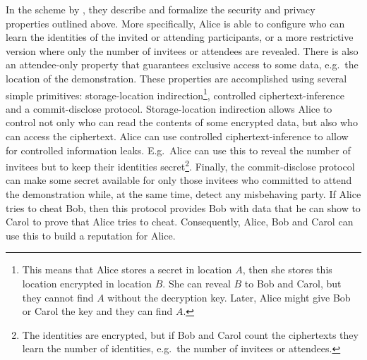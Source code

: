 In the scheme by \textcite{EventsInvitations}, they describe and formalize the 
security and privacy properties outlined above.
More specifically, Alice is able to configure who can learn the identities of 
the invited or attending participants, or a more restrictive version where only 
the number of invitees or attendees are revealed.
There is also an attendee-only property that guarantees exclusive access to 
some data, e.g.\ the location of the demonstration.
These properties are accomplished using several simple primitives:
storage-location indirection\footnote{%
  This means that Alice stores a secret in location \(A\), then she stores this
  location encrypted in location \(B\).
  She can reveal \(B\) to Bob and Carol, but they cannot find \(A\) without the
  decryption key.
  Later, Alice might give Bob or Carol the key and they can find \(A\).
},
controlled ciphertext-inference and
a commit-disclose protocol.
Storage-location indirection allows Alice to control not only who can read the 
contents of some encrypted data, but also who can access the ciphertext.
Alice can use controlled ciphertext-inference to allow for controlled 
information leaks.
E.g.\ Alice can use this to reveal the number of invitees but to keep their 
identities secret\footnote{%
  The identities are encrypted, but if Bob and Carol count the ciphertexts they
  learn the number of identities, e.g.\ the number of invitees or attendees.
}.
Finally, the commit-disclose protocol can make some secret available for only 
those invitees who committed to attend the demonstration while, at the same 
time, detect any misbehaving party.
If Alice tries to cheat Bob, then this protocol provides Bob with data 
that he can show to Carol to prove that Alice tries to cheat.
Consequently, Alice, Bob and Carol can use this to build a reputation for 
Alice.
